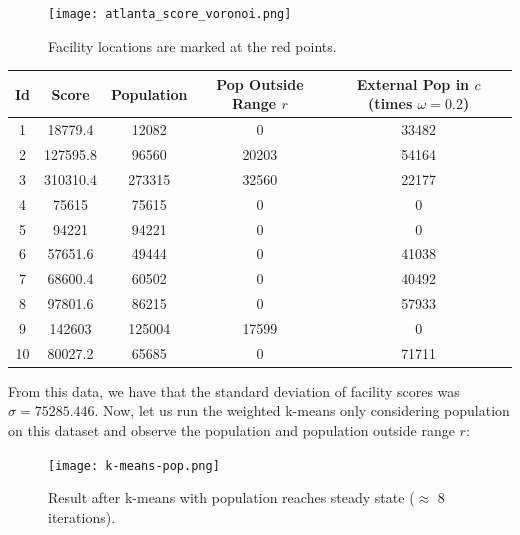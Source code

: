 \documentclass{article}
\begin{document}
\begin{figure}[H]
    \centering
    \captionsetup{justification=centering,width=.9\linewidth}
    \captionsetup{justification=centering}
    \texttt{[image: atlanta\_score\_voronoi.png]}
    \caption{Facility locations are marked at the red points.}
    \label{fig:final-interface}
\end{figure}
\begin{center}

\begin{tabular}{ | c | c | c | c | c | }
 \hline
 Id & Score & Population & Pop Outside Range $r$ & External Pop in $c$ (times $\omega=0.2$)\\
 \hline
 1 & 18779.4 & 12082 & 0 & 33482 \\ 
 2 & 127595.8 & 96560 & 20203 & 54164 \\  
 3 & 310310.4 & 273315 & 32560 & 22177 \\
 4 & 75615 & 75615 & 0 & 0 \\
 5 & 94221 & 94221 & 0 & 0 \\
 6 & 57651.6 & 49444 & 0 & 41038 \\
 7 & 68600.4 & 60502 & 0 & 40492 \\
 8 & 97801.6 & 86215 & 0 & 57933 \\
 9 & 142603 & 125004 & 17599 & 0 \\
 10 & 80027.2 & 65685 & 0 & 71711 \\
 \hline
\end{tabular}
\end{center}

From this data, we have that the standard deviation of facility scores was $\sigma = \mathbf{75285.446}$. Now, let us run the weighted k-means only considering population on this dataset and observe the population and population outside range $r$:

\begin{figure}[H]
    \centering
    \captionsetup{justification=centering,width=.9\linewidth}
    \captionsetup{justification=centering}
    \texttt{[image: k-means-pop.png]}
    \caption{Result after k-means with population reaches steady state ($\approx$ 8 iterations).}
    \label{fig:final-interface}
\end{figure}
\end{document}
